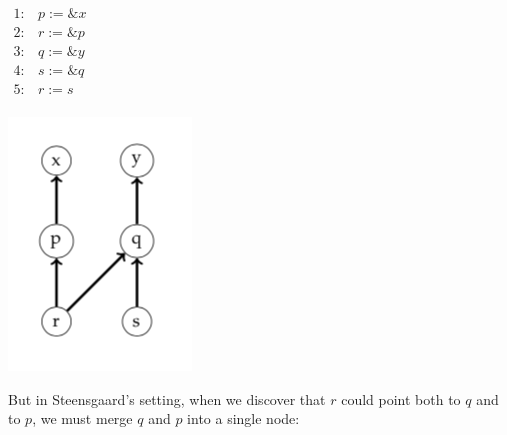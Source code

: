 \documentclass[11pt]{article}
\begin{document}
\begin{center}
\begin{minipage}[t]{0.30\textwidth} %
\vspace{-10em}
$\begin{array}{ll}
1: & p := \&x\\
2: & r := \&p\\
3: & q := \&y\\
4: & s := \&q\\
5: & r := s\\
\end{array}$
\end{minipage}
\hspace*{1em}
\begin{minipage}[b]{0.30\textwidth}
\includegraphics[scale=0.5]{images/andersens1}
\end{minipage}
\end{center}


But in Steensgaard's setting, when we discover that $r$ could point both to $q$ and to $p$, we must merge $q$ and $p$ into a single node:
\begin{center}
\end{center}
\end{document}
